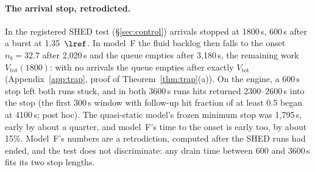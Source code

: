 \paragraph{The arrival stop, retrodicted.} In the registered SHED test (\S\ref{sec:control}) arrivals stopped at 1800\,s,
600\,s after a burst at 1.35~$\lref$. In model~F the fluid backlog then falls to the onset $n_b=32.7$ after 2{,}020\,s and the
queue empties after 3{,}180\,s, the remaining work $V_{\mathrm{tot}}(1800)$: with no arrivals the queue empties after exactly
$V_{\mathrm{tot}}$ (Appendix~\ref{app:trap}, proof of Theorem~\ref{thm:trap}(a)). On the
engine, a 600\,s stop left both runs stuck, and in both 3600\,s runs hits returned 2300--2600\,s into the stop (the first
300\,s window with follow-up hit fraction of at least 0.5 began at 4100\,s; post hoc). The quasi-static model's frozen minimum
stop was 1{,}795\,s, early by about a quarter, and model~F's time to the onset is early too, by about 15\%. Model~F's numbers are
a retrodiction, computed after the SHED runs had ended, and the test does not discriminate: any drain time between 600 and 3600\,s
fits its two stop lengths.
